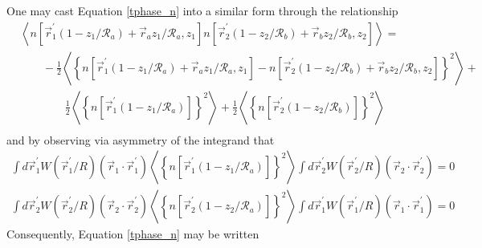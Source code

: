 One may cast Equation \ref{tphase_n} into a similar form through the relationship
\begin{equation}
\begin{aligned}
&  \left\langle n\left[\vec{r}^{\prime}_{1}\left(1-z_{1}/\mathcal{R}_{a}\right) + \vec{r}_{a} z_{1}/\mathcal{R}_{a}, z_{1}\right]
n\left[\vec{r}^{\prime}_{2}\left(1-z_{2}/\mathcal{R}_{b}\right) + \vec{r}_{b} z_{2}/\mathcal{R}_{b}, z_{2}\right] \right\rangle = \\
& \quad\quad -\frac{1}{2}\left\langle \left\{ n\left[\vec{r}^{\prime}_{1}\left(1-z_{1}/\mathcal{R}_{a}\right) + \vec{r}_{a} z_{1}/\mathcal{R}_{a}, z_{1}\right] - 
 n\left[\vec{r}^{\prime}_{2}\left(1-z_{2}/\mathcal{R}_{b}\right) + \vec{r}_{b} z_{2}/\mathcal{R}_{b}, z_{2}\right]\right\}^{2} \right\rangle + \\
&\quad\quad\quad\quad \frac{1}{2}\left\langle \left\{ n\left[\vec{r}^{\prime}_{1}\left(1-z_{1}/\mathcal{R}_{a}\right)\right]\right\}^{2}\right\rangle + 
\frac{1}{2}\left\langle \left\{ n\left[\vec{r}^{\prime}_{2}\left(1-z_{2}/\mathcal{R}_{b}\right)\right]\right\}^{2}\right\rangle \\
\end{aligned}
\end{equation}
and by observing via asymmetry of the integrand that
\begin{equation}\label{intzero}
\begin{aligned}
\int d\vec{r}^{\prime}_{1} W\left(\vec{r}^{\prime}_{1}/R\right) \left(\vec{r}_{1}\cdot\vec{r}^{\prime}_{1}\right)
\left\langle \left\{ n\left[\vec{r}^{\prime}_{1}\left(1-z_{1}/\mathcal{R}_{a}\right)\right]\right\}^{2}\right\rangle
\int d\vec{r}^{\prime}_{2} W\left(\vec{r}^{\prime}_{2}/R\right) \left(\vec{r}_{2}\cdot\vec{r}^{\prime}_{2}\right) = 0 \\
\int d\vec{r}^{\prime}_{2} W\left(\vec{r}^{\prime}_{2}/R\right) \left(\vec{r}_{2}\cdot\vec{r}^{\prime}_{2}\right) 
\left\langle \left\{ n\left[\vec{r}^{\prime}_{2}\left(1-z_{2}/\mathcal{R}_{a}\right)\right]\right\}^{2}\right\rangle
\int d\vec{r}^{\prime}_{1} W\left(\vec{r}^{\prime}_{1}/R\right) \left(\vec{r}_{1}\cdot\vec{r}^{\prime}_{1}\right) = 0
\end{aligned}
\end{equation}
Consequently, Equation \ref{tphase_n} may be written 
